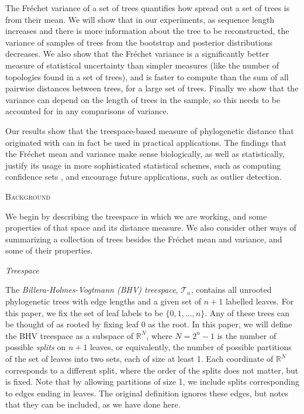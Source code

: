 \documentclass[12pt,letterpaper]{article}
\theoremstyle{plain}
\theoremstyle{definition}
\newcommand\RR{\mathbb{R}}
\newcommand\cT{\mathcal{T}}
\renewcommand{\section}[1]{%
\bigskip
\begin{center}
\begin{Large}
\normalfont\scshape #1
\medskip
\end{Large}
\end{center}}
\renewcommand{\subsection}[1]{%
\bigskip
\begin{center}
\begin{large}
\normalfont\itshape #1
\end{large}
\end{center}}
\begin{document}
The Fr\'echet variance of a set of trees quantifies how spread out a set of trees is from their mean. We will show that in our experiments, as sequence length increases and there is more information about the tree to be reconstructed, the variance of samples of trees from the bootstrap and posterior distributions decreases.  We also show that the Fr\'echet variance is a significantly better measure of statistical uncertainty than simpler measures (like the number of topologies found in a set of trees), and is faster to compute than the sum of all pairwise distances between trees, for a large set of trees. Finally we show that the variance can depend on the length of trees in the sample, so this needs to be accounted for in any comparisons of variance.

Our results show that the treespace-based measure of phylogenetic distance that originated with \citet{BHV01} can in fact be used in practical applications. The findings that the Fr\'echet mean and variance make sense biologically, as well as statistically, justify its usage in more sophisticated statistical schemes, such as computing confidence sets \citep{willisConfidence}, and encourage future applications, such as outlier detection.  

\bigskip

\section{Background}
We begin by describing the treespace in which we are working, and some properties of that space and its distance measure.  We also consider other ways of summarizing a collection of trees besides the Fr\'echet mean and variance, and some of their properties.

\subsection{Treespace}
The \emph{Billera-Holmes-Vogtmann (BHV) treespace}, $\cT_n$, \citep{BHV01} contains all unrooted phylogenetic trees with edge lengths and a given set of $n+1$ labelled leaves.  For this paper, we fix the set of leaf labels to be $\{0, 1, ..., n\}$.  Any of these trees can be thought of as rooted by fixing leaf 0 as the root. In this paper, we will define the BHV treespace as a subspace of $\RR^N$, where $N = 2^n - 1$ 
is the number of possible \emph{splits} on $n+1$ leaves, or equivalently, the number of possible partitions of the set of leaves into two sets, each of size at least 1. Each coordinate of $\RR^N$ corresponds to a different split, where the order of the splits does not matter, but is fixed.  Note that by allowing partitions of size 1, we include splits corresponding to edges ending in leaves.  The original definition \citep{BHV01} ignores these edges, but notes that they can be included, as we have done here. 
\end{document}
